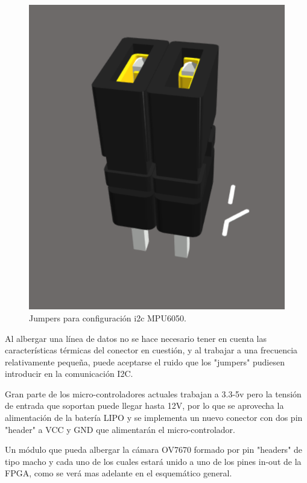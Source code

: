 \begin{itemize}
{		\begin{figure}[H]
		\center
		\includegraphics[scale=0.5]{imagenes/Balancing_robot/jumpers.PNG}
		\caption{Jumpers para configuración i2c MPU6050.}
		\label{fig:jumpers}
	    \end{figure}
	
	
	Al albergar una línea de datos no se hace necesario tener en cuenta las características térmicas del conector en cuestión, y al trabajar a una frecuencia relativamente pequeña, puede aceptarse el ruido que los "jumpers" pudiesen introducir en la comunicación I2C.
	
	\item Gran parte de los micro-controladores actuales trabajan a 3.3-5v pero la tensión de entrada que soportan puede llegar hasta 12V, por lo que se aprovecha la alimentación de la batería LIPO y se implementa un nuevo conector con dos pin "header" a VCC y GND que alimentarán el micro-controlador.
	
	\item Un módulo que pueda albergar la cámara OV7670 formado por pin "headers" de tipo macho y cada uno de los cuales estará unido a uno de los pines in-out de la FPGA, como se verá mas adelante en el esquemático general. 
	
}
\end{itemize}
